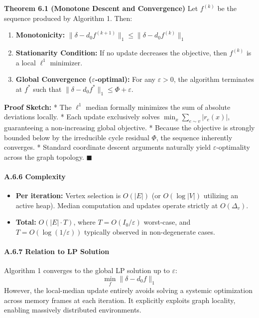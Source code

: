 \documentclass[
]{article}
\providecommand{\tightlist}{%
  \setlength{\itemsep}{0pt}\setlength{\parskip}{0pt}}
\begin{document}
\textbf{Theorem 6.1 (Monotone Descent and Convergence)} Let \(f^{(k)}\)
be the sequence produced by Algorithm 1. Then:

\begin{enumerate}
\def\labelenumi{\arabic{enumi}.}
\tightlist
\item
  \textbf{Monotonicity:}
  \(\|\delta - d_0 f^{(k+1)}\|_1 \leq \|\delta - d_0 f^{(k)}\|_1\)
\item
  \textbf{Stationarity Condition:} If no update decreases the objective,
  then \(f^{(k)}\) is a local \(\ell^1\) minimizer.
\item
  \textbf{Global Convergence (\(\varepsilon\)-optimal):} For any
  \(\varepsilon > 0\), the algorithm terminates at \(f^*\) such that
  \(\|\delta - d_0 f^*\|_1 \leq \Phi + \varepsilon\).
\end{enumerate}

\textbf{Proof Sketch:} * The \(\ell^1\) median formally minimizes the
sum of absolute deviations locally. * Each update exclusively solves
\(\min_{x} \sum_{e \sim v} |r_e(x)|\), guaranteeing a non-increasing
global objective. * Because the objective is strongly bounded below by
the irreducible cycle residual \(\Phi\), the sequence inherently
converges. * Standard coordinate descent arguments naturally yield
\(\varepsilon\)-optimality across the graph topology. \(\blacksquare\)

\paragraph{A.6.6 Complexity}\label{a.6.6-complexity}

\begin{itemize}
\tightlist
\item
  \textbf{Per iteration:} Vertex selection is \(O(|E|)\) (or
  \(O(\log |V|)\) utilizing an active heap). Median computation and
  updates operate strictly at \(O(\Delta_v)\).
\item
  \textbf{Total:} \(O(|E| \cdot T)\), where \(T = O(I_0 / \varepsilon)\)
  worst-case, and \(T = O(\log(1/\varepsilon))\) typically observed in
  non-degenerate cases.
\end{itemize}

\paragraph{A.6.7 Relation to LP
Solution}\label{a.6.7-relation-to-lp-solution}

Algorithm 1 converges to the global LP solution up to \(\varepsilon\):
\[ \min_f \|\delta - d_0 f\|_1 \] However, the local-median update
entirely avoids solving a systemic optimization across memory frames at
each iteration. It explicitly exploits graph locality, enabling
massively distributed environments.
\end{document}
